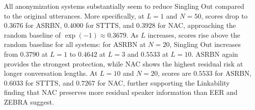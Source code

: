 \documentclass[12pt,leqno,a4paper]{article}
\begin{document}
\begin{table}[H]
\centering
\small
\renewcommand{\arraystretch}{1.02}
\caption{Singling Out results for conversation lengths $L$ and speaker 
population sizes $N$. Values are mean $\pm$ std across random runs. 
Random-predicate baseline: $\exp(-1) \approx 0.3679$.}
\label{tab:singling_out_all_results}
\end{table}

All anonymization systems substantially seem to reduce Singling Out compared to the original utterances. More specifically, at $L=1$ and $N=50$, scores drop to $0.3676$ for ASRBN, $0.4000$ for STTTS, and $0.3928$ for NAC, approaching the random baseline of $\exp(-1) \approx 0.3679$.  As $L$ increases, scores rise above the random baseline for all systems: for ASRBN at $N=20$, Singling Out increases from $0.3790$ at $L=1$ to $0.4642$ at $L=3$ and $0.5533$ at $L=10$. ASRBN again provides the strongest protection, while NAC shows the highest residual risk at longer conversation lengths. At $L=10$ and $N=20$, scores are $0.5533$ for ASRBN, $0.6033$ for STTTS, and $0.7267$ for NAC, further supporting the Linkability finding that NAC 
preserves more residual speaker information than EER and ZEBRA suggest.
\end{document}
